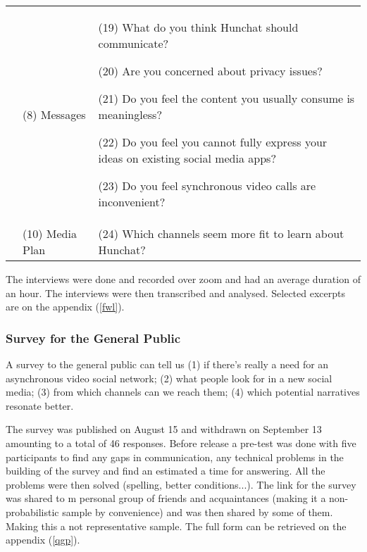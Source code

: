 \documentclass[12pt]{article}
\begin{document}
\begin{table}[htbp]
\begin{tabular}{ @{}P{0.15\textwidth}P{0.2\textwidth}P{0.6\textwidth}@{} }
	& (8) Messages &  (19) What do you think Hunchat should communicate? \par (20) Are you concerned about privacy issues? \par (21) Do you feel the content you usually consume is meaningless? \par (22) Do you feel you cannot fully express your ideas on existing social media apps? \par (23) Do you feel synchronous video calls are inconvenient?  \\
                                   & (10) Media Plan        & (24) Which channels seem more fit to learn about Hunchat?                                                                                                                                                                                                                                                                                                       \\ \hline
\end{tabular}
\end{table}

The interviews were done and recorded over zoom and had an average duration of an hour. The interviews were then transcribed and analysed. Selected excerpts are on the appendix (\ref{fwl}).


\subsubsection{Survey for the General Public}
A survey to the general public can tell us (1) if there's really a need for an asynchronous video social network; (2) what people look for in a new social media; (3) from which channels can we reach them; (4) which potential narratives resonate better. 

The survey was published on August 15 and withdrawn on September 13 amounting to a total of 46 responses. Before release a pre-test was done with five participants to find any gaps in communication, any technical problems in the building of the survey and find an estimated a time for answering. All the problems were then solved (spelling, better conditions...). The link for the survey was shared to m personal group of friends and acquaintances (making it a non-probabilistic sample by convenience) and was then shared by some of them. Making this a not representative sample. The full form can be retrieved on the appendix (\ref{qgp}).
\end{document}
